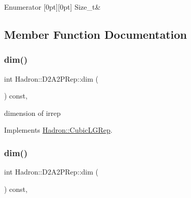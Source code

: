 \begin{DoxyEnumFields}{Enumerator}
[0pt][0pt]{}\mbox{\label{structHadron_1_1D2A2PRep_a1d87b729d87c46094b9328f18bb6536aa8730aa24b970ac4f1ea8deea429de0e7}} 
Size\+\_\+t&\\
\hline

\end{DoxyEnumFields}


\subsection{Member Function Documentation}
\mbox{\label{structHadron_1_1D2A2PRep_a1b4aaa7427dc7ee8255807a8cfa19e61}} 
\subsubsection{\texorpdfstring{dim()}{dim()}\hspace{0.1cm}{\footnotesize\ttfamily [1/3]}}
{\footnotesize\ttfamily int Hadron\+::\+D2\+A2\+P\+Rep\+::dim (\begin{DoxyParamCaption}{ }\end{DoxyParamCaption}) const\hspace{0.3cm}{\ttfamily [inline]}, {\ttfamily [virtual]}}

dimension of irrep 

Implements \mbox{\hyperlink{structHadron_1_1CubicLGRep_a3acbaea26503ed64f20df693a48e4cdd}{Hadron\+::\+Cubic\+L\+G\+Rep}}.

\mbox{\label{structHadron_1_1D2A2PRep_a1b4aaa7427dc7ee8255807a8cfa19e61}} 
\subsubsection{\texorpdfstring{dim()}{dim()}\hspace{0.1cm}{\footnotesize\ttfamily [2/3]}}
{\footnotesize\ttfamily int Hadron\+::\+D2\+A2\+P\+Rep\+::dim (\begin{DoxyParamCaption}{ }\end{DoxyParamCaption}) const\hspace{0.3cm}{\ttfamily [inline]}, {\ttfamily [virtual]}}

